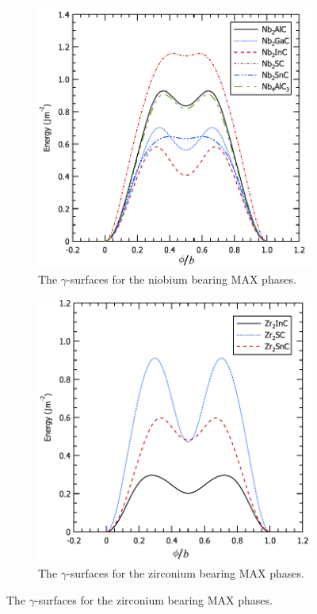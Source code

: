 \begin{figure}
\centering
\begin{subfigure}{7cm}
\centering
\includegraphics[width=\textwidth]{Nb_gamma_surfaces}
\caption{The $\gamma$-surfaces for the niobium bearing MAX phases.\label{fig:Nb_gamma_surfaces}}
\end{subfigure}

\begin{subfigure}{7cm}
\centering
\includegraphics[width=\textwidth]{Zr_gamma_surfaces}
\caption{The $\gamma$-surfaces for the zirconium bearing MAX phases.\label{fig:Zr_gamma_surfaces}}
\end{subfigure}


\end{figure}
